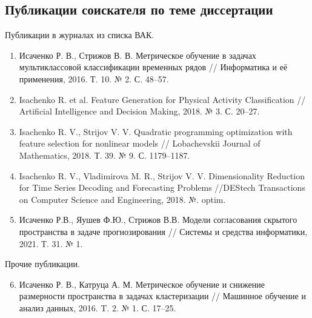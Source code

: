 \documentclass[11pt, a5paper]{dissert}
\begin{document}
\subsection*{Публикации соискателя по теме диссертации}
Публикации в журналах из списка ВАК.
\vspace{0.3cm}
\begin{enumerate}
	\item Исаченко Р. В., Стрижов В. В. Метрическое обучение в задачах мультиклассовой классификации временных рядов // Информатика и её применения, 2016. Т. 10. № 2. С. 48--57.
	\item Isachenko R. et al. Feature Generation for Physical Activity Classification // Artificial Intelligence and Decision Making, 2018. № 3. С. 20--27.
	\item Isachenko R. V., Strijov V. V. Quadratic programming optimization with feature selection for nonlinear models // Lobachevskii Journal of Mathematics, 2018. Т. 39. № 9. С. 1179--1187.
	\item Isachenko R. V., Vladimirova M. R., Strijov V. V. Dimensionality Reduction for Time Series Decoding and Forecasting Problems //DEStech Transactions on Computer Science and Engineering, 2018. №. optim.
	\item Исаченко Р.В., Яушев Ф.Ю., Стрижов В.В. Модели согласования скрытого пространства в задаче прогнозирования // Системы и средства информатики, 2021. Т. 31. № 1.
\end{enumerate}

\vspace{0.4cm}
{Прочие публикации.}
\vspace{0.2cm}
\begin{enumerate}
\setcounter{enumi}{5}
	\item Исаченко Р. В., Катруца А. М. Метрическое обучение и снижение размерности пространства в задачах кластеризации // Машинное обучение и анализ данных, 2016. T. 2. № 1. С. 17--25.
\end{enumerate}
\end{document}
